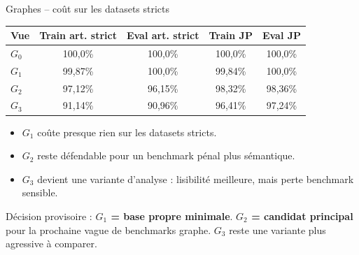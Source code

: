 \documentclass[aspectratio=169,10pt]{beamer}
\newcommand{\keybox}[1]{%
  \begin{center}
  \colorbox{accentsoft}{\parbox{0.92\linewidth}{\centering #1}}
  \end{center}}
\begin{document}
\begin{frame}{Graphes -- coût sur les datasets stricts}
  \scriptsize
  \begin{center}
  \renewcommand{\arraystretch}{1.14}
  \setlength{\tabcolsep}{4pt}
  \begin{tabular}{@{}l c c c c@{}}
    \toprule
    \textbf{Vue} & \textbf{Train art. strict} & \textbf{Eval art. strict} & \textbf{Train JP} & \textbf{Eval JP} \\
    \midrule
    $G_0$ & 100,0\% & 100,0\% & 100,0\% & 100,0\% \\
    \rowcolor{green!10}
    $G_1$ & 99,87\% & 100,0\% & 99,84\% & 100,0\% \\
    \rowcolor{accentsoft}
    $G_2$ & 97,12\% & 96,15\% & 98,32\% & 98,36\% \\
    $G_3$ & 91,14\% & 90,96\% & 96,41\% & 97,24\% \\
    \bottomrule
  \end{tabular}
  \end{center}

  \vspace{0.35em}
  \begin{itemize}\setlength{\itemsep}{0.2em}
    \item $G_1$ coûte presque rien sur les datasets stricts.
    \item $G_2$ reste défendable pour un benchmark pénal plus sémantique.
    \item $G_3$ devient une variante d'analyse : lisibilité meilleure, mais perte benchmark sensible.
  \end{itemize}

  \vspace{0.3em}
  \keybox{\scriptsize Décision provisoire : \textbf{$G_1$ = base propre minimale}. \textbf{$G_2$ = candidat principal}
  pour la prochaine vague de benchmarks graphe. \textbf{$G_3$} reste une variante plus agressive à comparer.}
\end{frame}
\end{document}
